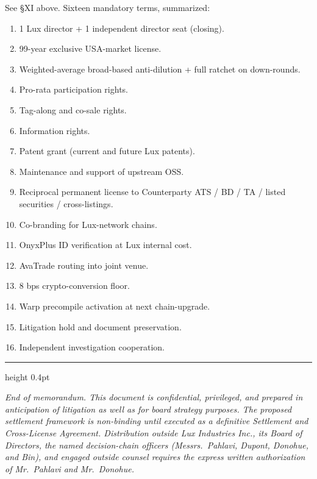 \documentclass[11pt,letterpaper]{article}
\begin{document}
See \S XI above. Sixteen mandatory terms, summarized:

\begin{enumerate}[leftmargin=1.5em,itemsep=0.05em]
\item 1 Lux director + 1 independent director seat (closing).
\item 99-year exclusive USA-market license.
\item Weighted-average broad-based anti-dilution + full ratchet
on down-rounds.
\item Pro-rata participation rights.
\item Tag-along and co-sale rights.
\item Information rights.
\item Patent grant (current and future Lux patents).
\item Maintenance and support of upstream OSS.
\item Reciprocal permanent license to Counterparty ATS / BD / TA /
listed securities / cross-listings.
\item Co-branding for Lux-network chains.
\item OnyxPlus ID verification at Lux internal cost.
\item AvaTrade routing into joint venue.
\item 8 bps crypto-conversion floor.
\item Warp precompile activation at next chain-upgrade.
\item Litigation hold and document preservation.
\item Independent investigation cooperation.
\end{enumerate}

\vfill
\hrule height 0.4pt
\vspace{0.5em}
\begin{small}
\textit{End of memorandum. This document is confidential, privileged,
and prepared in anticipation of litigation as well as for board
strategy purposes. The proposed settlement framework is non-binding
until executed as a definitive Settlement and Cross-License Agreement.
Distribution outside Lux Industries Inc., its Board of Directors, the
named decision-chain officers (Messrs.\ Pahlavi, Dupont, Donohue, and
Bin), and engaged outside counsel requires the express written
authorization of Mr.\ Pahlavi and Mr.\ Donohue.}
\end{small}
\end{document}
